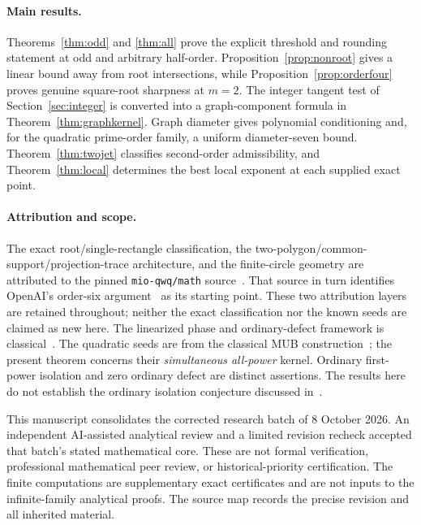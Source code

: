\paragraph{Main results.}
Theorems~\ref{thm:odd} and \ref{thm:all} prove the explicit threshold and rounding statement at odd and arbitrary half-order. Proposition~\ref{prop:nonroot} gives a linear bound away from root intersections, while Proposition~\ref{prop:orderfour} proves genuine square-root sharpness at $m=2$. The integer tangent test of Section~\ref{sec:integer} is converted into a graph-component formula in Theorem~\ref{thm:graphkernel}. Graph diameter gives polynomial conditioning and, for the quadratic prime-order family, a uniform diameter-seven bound. Theorem~\ref{thm:twojet} classifies second-order admissibility, and Theorem~\ref{thm:local} determines the best local exponent at each supplied exact point.

\paragraph{Attribution and scope.}
The exact root/single-rectangle classification, the two-polygon/common-support/projection-trace architecture, and the finite-circle geometry are attributed to the pinned \texttt{mio-qwq/math} source~\cite{mio}. That source in turn identifies OpenAI's order-six argument~\cite{openai} as its starting point. These two attribution layers are retained throughout; neither the exact classification nor the known seeds are claimed as new here. The linearized phase and ordinary-defect framework is classical~\cite{TZ}. The quadratic seeds are from the classical MUB construction~\cite{MW,BOP}; the present theorem concerns their \emph{simultaneous all-power} kernel. Ordinary first-power isolation and zero ordinary defect are distinct assertions. The results here do not establish the ordinary isolation conjecture discussed in~\cite{BOP}.

This manuscript consolidates the corrected research batch of 8 October 2026. An independent AI-assisted analytical review and a limited revision recheck accepted that batch's stated mathematical core. These are not formal verification, professional mathematical peer review, or historical-priority certification. The finite computations are supplementary exact certificates and are not inputs to the infinite-family analytical proofs. The source map records the precise revision and all inherited material.
